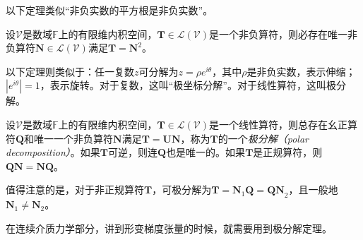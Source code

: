 \documentclass[main.tex]{subfiles}
\begin{document}
以下定理类似“非负实数的平方根是非负实数”。

\begin{theorem}\label{thm:II.2.36}
    设$\mathcal{V}$是数域$\mathbb{F}$上的有限维内积空间，$\mathbf{T}\in\mathcal{L}\left(\mathcal{V}\right)$是一个非负算符，则必存在唯一非负算符$\mathbf{N}\in\mathcal{L}\left(\mathcal{V}\right)$满足$\mathbf{T}=\mathbf{N}^2$。
\end{theorem}

以下定理则类似于：任一复数$z$可分解为$z=\rho e^{i\theta}$，其中$\rho$是非负实数，表示伸缩；$\left|e^{i\theta}\right|=1$，表示旋转。对于复数，这叫“极坐标分解”。对于线性算符，这叫极分解。

\begin{theorem}[极分解]\label{thm:II.2.37}
    设$\mathcal{V}$是数域$\mathbb{F}$上的有限维内积空间，$\mathbf{T}\in\mathcal{L}\left(\mathcal{V}\right)$是一个线性算符，则总存在幺正算符$\mathbf{Q}$和唯一一个非负算符$\mathbf{N}$满足$\mathbf{T}=\mathbf{UN}$，称为$\mathbf{T}$的一个\emph{极分解（polar decomposition）}。如果$\mathbf{T}$可逆，则连$\mathbf{Q}$也是唯一的。如果$\mathbf{T}$是正规算符，则$\mathbf{QN}=\mathbf{NQ}$。
\end{theorem}

值得注意的是，对于非正规算符$\mathbf{T}$，可极分解为$\mathbf{T}=\mathbf{N}_1\mathbf{Q}=\mathbf{QN}_2$，且一般地$\mathbf{N}_1\neq\mathbf{N}_2$。

在连续介质力学部分，讲到形变梯度张量的时候，就需要用到极分解定理。
\end{document}
